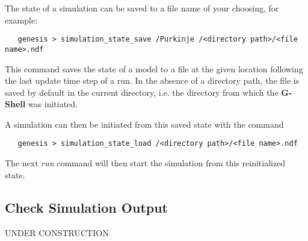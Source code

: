 \documentclass[12pt]{article}
\begin{document}
The state of a simulation can be saved to a file name of your choosing, for example:
\begin{verbatim}
   genesis > simulation_state_save /Purkinje /<directory path>/<file name>.ndf
\end{verbatim}
This command saves the state of a model to a file at the given location following the last update time step of a run. In the absence of a directory path, the file is saved by default in the current directory, i.e. the directory from which the {\bf G-Shell} was initiated.

A simulation can then be initiated from this saved 
state with the command 
\begin{verbatim}
   genesis > simulation_state_load /<directory path>/<file name>.ndf 
\end{verbatim}
The next {\it run} command will then start the simulation from this reinitialized state.

\subsection*{Check Simulation Output}

UNDER CONSTRUCTION
\end{document}
